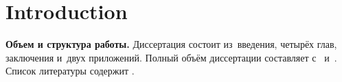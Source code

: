 \chapter*{Introduction}							%

\newcommand{\actuality}{}
\newcommand{\aim}{\textbf{Целью}}
\newcommand{\tasks}{задачи}
\newcommand{\defpositions}{\textbf{Основные положения, выносимые на~защиту:}}
\newcommand{\novelty}{\textbf{Научная новизна:}}
\newcommand{\influence}{\textbf{Научная и практическая значимость}}
\newcommand{\reliability}{\textbf{Степень достоверности}}
\newcommand{\probation}{\textbf{Апробация работы.}}
\newcommand{\contribution}{\textbf{Личный вклад.}}
\newcommand{\publications}{\textbf{Публикации.}}



\textbf{Объем и структура работы.} Диссертация состоит из~введения, четырёх глав, заключения и~двух приложений.
%
Полный объём диссертации составляет  
с~
и~. Список литературы содержит  
.
